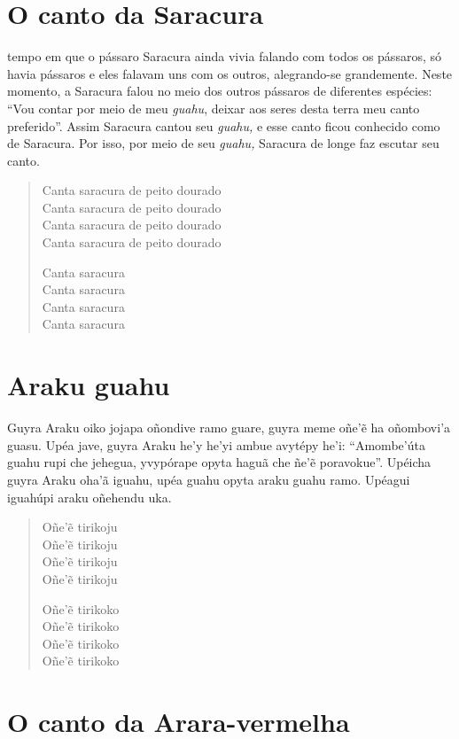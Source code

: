 \chapter{O canto da Saracura}

 tempo em que o pássaro Saracura ainda vivia falando com todos os
pássaros, só havia pássaros e eles falavam uns com os outros,
alegrando-se grandemente. Neste momento, a Saracura falou no meio dos
outros pássaros de diferentes espécies: ``Vou contar por meio de meu
\emph{guahu}, deixar aos seres desta terra meu canto preferido''. Assim
Saracura cantou seu \emph{guahu,} e esse canto ficou conhecido como de
Saracura. Por isso, por meio de seu \emph{guahu,} Saracura de longe faz
escutar seu canto.

\begin{verse}
Canta saracura de peito dourado\\
Canta saracura de peito dourado\\
Canta saracura de peito dourado\\
Canta saracura de peito dourado

Canta saracura\\
Canta saracura\\
Canta saracura\\
Canta saracura
\end{verse}

\chapter{Araku guahu}

Guyra Araku oiko jojapa oñondive ramo guare, guyra meme oñe'ẽ ha
oñombovi'a guasu. Upéa jave, guyra Araku he'y he'yi ambue avytépy he'i:
``Amombe'úta guahu rupi che jehegua, yvypórape opyta haguã che ñe'ẽ
poravokue''. Upéicha guyra Araku oha'ã iguahu, upéa guahu opyta araku
guahu ramo. Upéagui iguahúpi araku oñehendu uka.

\begin{verse}
Oñe'ẽ tirikoju\\
Oñe'ẽ tirikoju\\
Oñe'ẽ tirikoju\\
Oñe'ẽ tirikoju

Oñe'ẽ tirikoko\\
Oñe'ẽ tirikoko\\
Oñe'ẽ tirikoko\\
Oñe'ẽ tirikoko
\end{verse}

\chapter{O canto da Arara-vermelha}

